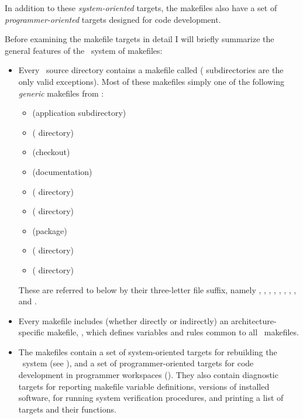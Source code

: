 In addition to these {\em system-oriented} targets, the makefiles also have a
set of {\em programmer-oriented} targets designed for code development.

Before examining the makefile targets in detail I will briefly summarize the
general features of the \aipspp\ system of makefiles:

\begin{itemize}
\item
   Every \aipspp\ source directory contains a makefile called
    ( subdirectories are the only valid exceptions).
   Most of these makefiles simply  one of the following
   {\em generic} makefiles from :

   \begin{itemize}
   \item
        (application subdirectory)
   \item
        ( directory)
   \item
        (checkout)
   \item
        (documentation)
   \item
        ( directory)
   \item
        ( directory)
   \item
        (package)
   \item
        ( directory)
   \item
        ( directory)
   \end{itemize}

   These are referred to below by their three-letter file suffix, namely
   , , , , , ,
   , , and .

\item
   Every makefile includes (whether directly or indirectly) an
   architecture-specific makefile, , which
   defines variables and rules common to all \aipspp\ makefiles.

\item
   The makefiles contain a set of system-oriented targets for rebuilding the
   \aipspp\ system (see ), and a set of
   programmer-oriented targets for code development in programmer workspaces
   ().  They also contain diagnostic targets for
   reporting makefile variable definitions, versions of installed software,
   for running system verification procedures, and printing a list of
   targets and their functions.


\end{itemize}
